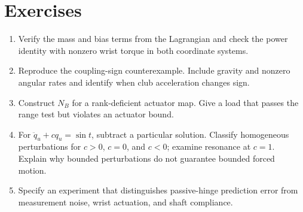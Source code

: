 \section{Exercises}
\enlargethispage{3\baselineskip}

\begin{enumerate}
\item Verify the mass and bias terms from the Lagrangian and check the power
identity with nonzero wrist torque in both coordinate systems.
\item Reproduce the coupling-sign counterexample. Include gravity and nonzero
angular rates and identify when club acceleration changes sign.
\item Construct $N_B$ for a rank-deficient actuator map. Give a load that passes
the range test but violates an actuator bound.
\item For $\ddot q_u+cq_u=\sin t$, subtract a particular solution. Classify
homogeneous perturbations for $c>0$, $c=0$, and $c<0$; examine resonance at $c=1$.
Explain why bounded perturbations do not guarantee bounded forced motion.
\item Specify an experiment that distinguishes passive-hinge prediction error
from measurement noise, wrist actuation, and shaft compliance.
\end{enumerate}

